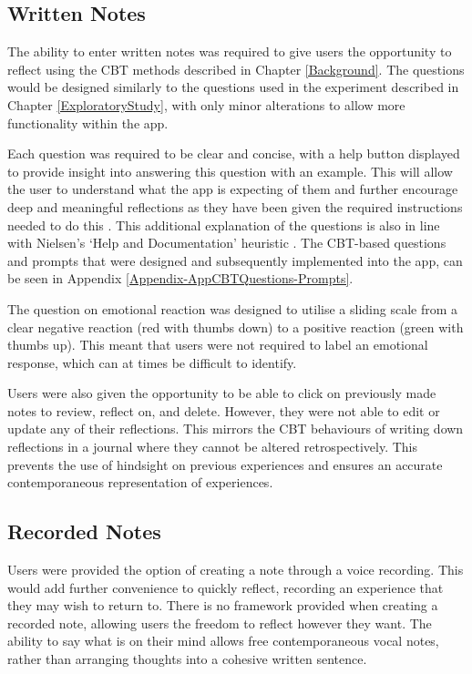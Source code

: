 \documentclass{l4proj}
\begin{document}
\subsection{Written Notes}

The ability to enter written notes was required to give users the opportunity to reflect using the CBT methods described in Chapter \ref{Background}. The questions would be designed similarly to the questions used in the experiment described in Chapter \ref{ExploratoryStudy}, with only minor alterations to allow more functionality within the app. 

Each question was required to be clear and concise, with a help button displayed to provide insight into answering this question with an example. This will allow the user to understand what the app is expecting of them and further encourage deep and meaningful reflections as they have been given the required instructions needed to do this \citep{bruno_reflective_2018}. This additional explanation of the questions is also in line with Nielsen’s ‘Help and Documentation’ heuristic \citep{Nielsen10}. The CBT-based questions and prompts that were designed and subsequently implemented into the app, can be seen in Appendix \ref{Appendix-AppCBTQuestions-Prompts}.

The question on emotional reaction was designed to utilise a sliding scale from a clear negative reaction (red with thumbs down) to a positive reaction (green with thumbs up). This meant that users were not required to label an emotional response, which can at times be difficult to identify. 

Users were also given the opportunity to be able to click on previously made notes to review, reflect on, and delete. However, they were not able to edit or update any of their reflections. This mirrors the CBT behaviours of writing down reflections in a journal where they cannot be altered retrospectively. This prevents the use of hindsight on previous experiences and ensures an accurate contemporaneous representation of experiences.


\subsection{Recorded Notes}

Users were provided the option of creating a note through a voice recording. This would add further convenience to quickly reflect, recording an experience that they may wish to return to. There is no framework provided when creating a recorded note, allowing users the freedom to reflect however they want. The ability to say what is on their mind allows free contemporaneous vocal notes, rather than arranging thoughts into a cohesive written sentence.
\end{document}
